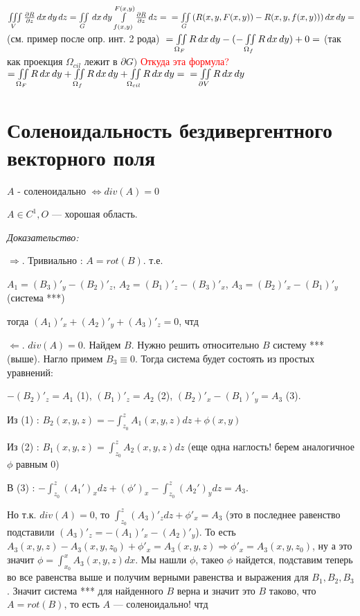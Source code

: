 \documentclass[paper=a4, fontsize=17pt]{article}
\begin{document}
$\iiint\limits_{V}{\frac {\partial R}{\partial z} \,dx\,dy\,dz}
= \iint\limits_G\,dx\,dy\int\limits_{f(x,y)}^{F(x,y)} {\frac {\partial R}{\partial z} \,dz} = \\
= \iint\limits_G{(R(x,y, F(x,y)) - R(x, y, f(x,y)))\,dx\,dy} = $ (см. пример после опр. инт. 2 рода) $\\
= \iint\limits_{\Omega_F}{R\,dx\,dy} - (-\iint\limits_{\Omega_f}{R\,dx\,dy}) + 0  = $ (так как проекция $\Omega_{cil}$ лежит в $\partial G )$ \textcolor{red}{Откуда эта формула?}\\
$= \iint\limits_{\Omega_F}{R\,dx\,dy} + \iint\limits_{\Omega_f}{R\,dx\,dy} + \iint\limits_{\Omega_{cil}}{R\,dx\,dy} = \\
= \iint\limits_{\partial V}{R\,dx\,dy}$

\section{Соленоидальность бездивергентного векторного поля}

$A$ - соленоидально $ \Leftrightarrow div(A) = 0 $

$A \in C^1, O $ --- хорошая область.

\emph{Доказательство:}

$\Rightarrow $. Тривиально : $A = rot(B)$. т.е. 

$A_1 = (B_3)'_y - (B_2)'_z$, $A_2 = (B_1)'_z - (B_3)'_x$, $A_3 = (B_2)'_x - (B_1)'_y$ (система ***)

тогда $(A_1)'_x + (A_2)'_y + (A_3)'_z = 0$, чтд

$\Leftarrow $. $div(A) = 0$. Найдем $B$. Нужно решить относительно $B$ систему *** (выше). Нагло примем $B_3 \equiv 0$. Тогда система будет состоять из простых уравнений:

$-(B_2)'_z = A_1$ (1), $(B_1)'_z = A_2$ (2), $(B_2)'_x - (B_1)'_y = A_3$ (3). 

Из (1) : $B_2(x, y, z) = - \int_{z_0}^{z} A_1(x, y, z)dz + \phi(x, y)$

Из (2) : $B_1(x, y, z) = \int_{z_0}^{z} A_2(x, y, z)dz$ (еще одна наглость! берем аналогичное $\phi$ равным $0$)

В (3) : $- \int_{z_0}^{z} (A_{1}')_{x} dz + (\phi')_x - \int_{z_0}^{z} (A_{2}')_{y} dz = A_3$.

Но т.к. $div(A) = 0$, то $\int_{z_0}^{z} (A_3)'_z dz + \phi'_x = A_3$ (это в последнее равенство подставили $(A_3)'_z = -(A_1)'_x - (A_2)'_y$). То есть $A_3(x, y, z) - A_3(x, y, z_0) + \phi'_x = A_3(x, y, z) \Rightarrow \phi'_x = A_3(x, y, z_0)$, ну а это значит $\phi = \int_{x_0}^{x} A_3(x, y, z)dx$. Мы нашли $\phi$, такео $\phi$ найдется, подставим теперь во все равенства выше и получим верными равенства и выражения для $B_1, B_2, B_3$. Значит система *** для найденного $B$ верна и значит это $B$ таково, что $A = rot(B)$, то есть $A$ --- соленоидально! чтд
\end{document}
